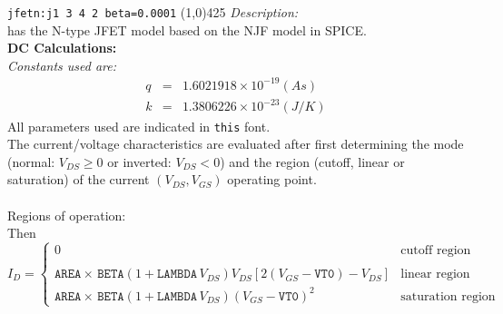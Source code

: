 \documentclass{article}
\begin{document}
\texttt{jfetn:j1\ 3\ 4\ 2\ beta=0.0001}
\newline
\linethickness{0.5mm} \line(1,0){425}
\newline
\textit{Description:}\\%
\FDA has the N-type JFET model based on the NJF model in SPICE. \\
\newpage
\noindent\textbf{DC Calculations:} \\
\textit{Constants used are:} \\
\begin{eqnarray}
q & = & 1.6021918 \times 10^{-19} (As) \\
k & = & 1.3806226 \times 10^{-23} (J/K)
\end{eqnarray}
All parameters used are indicated in \texttt{this} font.\\

\noindent The current/voltage characteristics are evaluated after
first determining the mode (normal: $V_{DS} \ge 0$ or inverted:
$V_{DS} < 0$) and the region (cutoff, linear or saturation) of the
current $(V_{DS}, V_{GS})$ operating point.\\

\\

Regions of operation:
\newline
{}\\
Then
\begin{equation}
I_{D} = \left\{ \begin{array}{ll}
      0  & \mbox{cutoff region} \\ \\
      \texttt{AREA} \times\, \texttt{BETA} \left(1 + \texttt{LAMBDA} \, V_{DS}\right)V_{DS}
      \left[2\left(V_{GS}- \texttt{VT0}\right)-V_{DS}\right]
         &\mbox{linear region}\\
      \texttt{AREA} \times \, \texttt{BETA} \left(1 + \texttt{LAMBDA} \, V_{DS}\right)
      \left(V_{GS}- \texttt{VT0}\right)^2
         &\mbox{saturation region} \end{array} \right. %
\end{equation}\\
\end{document}
